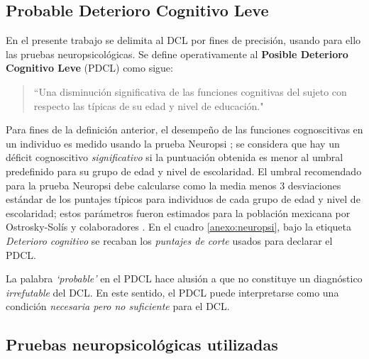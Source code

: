 \documentclass[12pt,letterpaper]{book}
\begin{document}
\subsection{Probable Deterioro Cognitivo Leve}

En el presente trabajo se delimita al DCL por fines de precisión, usando para ello las pruebas neuropsicológicas. 
%
Se define operativamente al \textbf{Posible Deterioro Cognitivo Leve} (PDCL) como sigue:
\begin{quote}
``Una disminución significativa de las funciones cognitivas del sujeto con respecto las típicas de su edad y nivel de educación."
\end{quote}

Para fines de la definición anterior, el desempeño de las funciones cognoscitivas en un individuo es medido usando la prueba Neuropsi \cite{Ostrosky1999}; se considera que hay un déficit cognoscitivo \textit{significativo} si la puntuación obtenida es menor al umbral predefinido para su grupo de edad y nivel de escolaridad.
%
El umbral recomendado para la prueba Neuropsi debe calcularse como la media menos 3 desviaciones estándar de los puntajes típicos para individuos de cada grupo de edad y nivel de escolaridad; estos parámetros fueron estimados para la población mexicana por Ostrosky-Solís y colaboradores \cite{Ostrosky1999}.
%
En el cuadro \ref{anexo:neuropsi}, bajo la etiqueta \textit{Deterioro cognitivo} se recaban los \textit{puntajes de corte} usados para declarar el PDCL.

La palabra \textit{`probable'} en el PDCL hace alusión a que no constituye un diagnóstico \textit{irrefutable} del DCL.
%
En este sentido, el PDCL puede interpretarse como una condición \textit{necesaria pero no suficiente} para el DCL.


\subsection{Pruebas neuropsicológicas utilizadas}
\label{seccion:pruebas}
\end{document}
